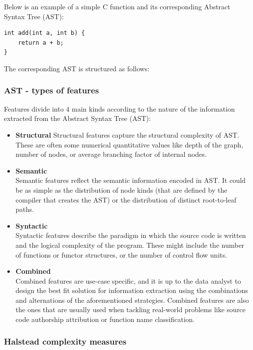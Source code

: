 \documentclass{article}
\begin{document}
Below is an example of a simple C function and its corresponding Abstract Syntax Tree (AST):
\begin{verbatim}
int add(int a, int b) {
    return a + b;
}
\end{verbatim}

The corresponding AST is structured as follows:

\subsubsection{AST - types of features}

Features divide into 4 main kinds according to the nature of the information extracted from the Abstract Syntax Tree (AST):
\begin{itemize}
    \item \textbf{Structural} \label{item:structural}
    Structural features capture the structural complexity of AST. These are often some numerical quantitative values like depth of the graph, number of nodes, or average branching factor of internal nodes.
    \item \textbf{Semantic} \\
    Semantic features reflect the semantic information encoded in AST. It could be as simple as the distribution of node kinds (that are defined by the compiler that creates the AST) or the distribution of distinct root-to-leaf paths.
    \item \textbf{Syntactic} \\
    Syntactic features describe the paradigm in which the source code is written and the logical complexity of the program. These might include the number of functions or functor structures, or the number of control flow units.
    \item \textbf{Combined} \\
    Combined features are use-case specific, and it is up to the data analyst to design the best fit solution for information extraction using the combinations and alternations of the aforementioned strategies. Combined features are also the ones that are usually used when tackling real-world problems like source code authorship attribution or function name classification.  
\end{itemize}

\subsubsection{Halstead complexity measures}
\end{document}
